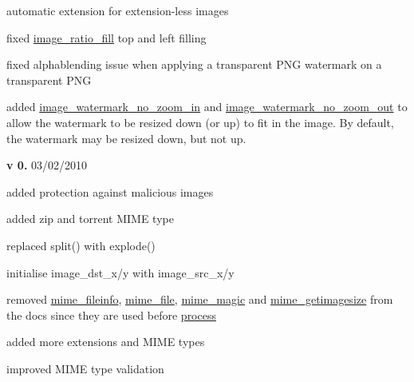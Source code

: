 \begin{DoxyItemize}
\begin{DoxyItemize}
\item automatic extension for extension-\/less images~\newline

\item fixed \hyperlink{}{image\+\_\+ratio\+\_\+fill} top and left filling~\newline

\item fixed alphablending issue when applying a transparent P\+N\+G watermark on a transparent P\+N\+G~\newline

\item added \hyperlink{}{image\+\_\+watermark\+\_\+no\+\_\+zoom\+\_\+in} and \hyperlink{}{image\+\_\+watermark\+\_\+no\+\_\+zoom\+\_\+out} to allow the watermark to be resized down (or up) to fit in the image. By default, the watermark may be resized down, but not up. 
\end{DoxyItemize}
\item {\bfseries v 0.} 03/02/2010~\newline

\begin{DoxyItemize}
\item added protection against malicious images~\newline

\item added zip and torrent M\+I\+M\+E type~\newline

\item replaced split() with explode()~\newline

\item initialise image\+\_\+dst\+\_\+x/y with image\+\_\+src\+\_\+x/y~\newline

\item removed \hyperlink{}{mime\+\_\+fileinfo}, \hyperlink{}{mime\+\_\+file}, \hyperlink{}{mime\+\_\+magic} and \hyperlink{}{mime\+\_\+getimagesize} from the docs since they are used before \hyperlink{}{process}~\newline

\item added more extensions and M\+I\+M\+E types~\newline

\item improved M\+I\+M\+E type validation~\newline


\end{DoxyItemize}
\end{DoxyItemize}
